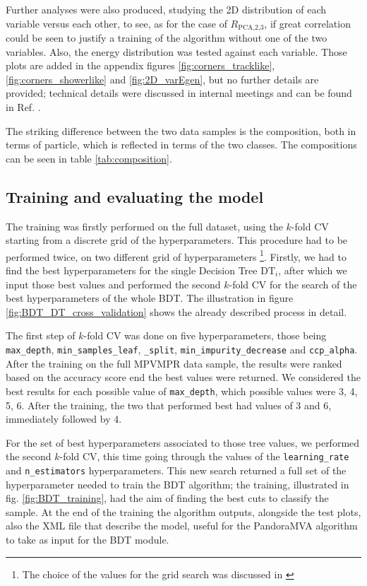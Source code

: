Further analyses were also produced, studying the 2D distribution of each variable versus each other, to see, as for the case of $R_\text{PCA,2,3}$, if great correlation could be seen to justify a training of the algorithm without one of the two variables. Also, the energy distribution was tested against each variable. Those plots are added in the appendix figures \ref{fig:corners_tracklike}, \ref{fig:corners_showerlike} and \ref{fig:2D_varEgen}, but no further details are provided; technical details were discussed in internal meetings and can be found in Ref. \cite{Sotgia:2024a, *Sotgia:2024b, *Sotgia:2024c, *Sotgia:2024d}. 

The striking difference between the two data samples is the composition, both in terms of particle, which is reflected in terms of the two classes. The compositions can be seen in table \ref{tab:composition}. 



\subsection{Training and evaluating the model}

The training was firstly performed on the full dataset, using the $k$-fold CV starting from a discrete grid of the hyperparameters. This procedure had to be performed twice, on two different grid of hyperparameters \footnote{The choice of the values for the grid search was discussed in \cite{Sotgia:2024a, *Sotgia:2024b, *Sotgia:2024c, *Sotgia:2024d}}. Firstly, we had to find the best hyperparameters for the single Decision Tree $\mathrm{DT}_i$, after which we input those best values and performed the second $k$-fold CV for the search of the best hyperparameters of the whole BDT. The illustration in figure \ref{fig:BDT_DT_cross_validation} shows the already described process in detail. 

The first step of $k$-fold CV was done on five hyperparameters, those being \verb=max_depth=, \verb=min_samples_leaf=, \verb=_split=, \verb=min_impurity_decrease= and \verb=ccp_alpha=. After the training on the full MPVMPR data sample, the results were ranked based on the accuracy score end the best values were returned. We considered the best results for each possible value of \verb=max_depth=, which possible values were 3, 4, 5, 6. After the training, the two that performed best had values of 3 and 6, immediately followed by 4. 

For the set of best hyperparameters associated to those tree values, we performed the second $k$-fold CV, this time going through the values of the \verb=learning_rate= and \verb=n_estimators= hyperparameters. This new search returned a full set of the hyperparameter needed to train the BDT algorithm; the training, illustrated in fig. \ref{fig:BDT_training}, had the aim of finding the best cuts to classify the sample. At the end of the training the algorithm outputs, alongside the test plots, also the XML file that describe the model, useful for the PandoraMVA algorithm to take as input for the BDT module. 

